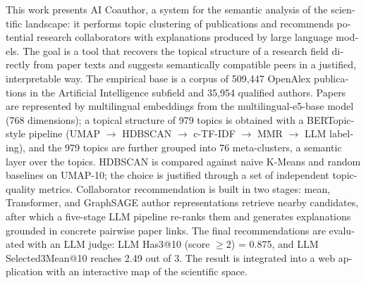\begin{english}
This work presents AI Coauthor, a system for the semantic analysis of the scientific landscape:
it performs topic clustering of publications and recommends potential research collaborators with
explanations produced by large language models. The goal is a tool that recovers the topical
structure of a research field directly from paper texts and suggests semantically compatible peers
in a justified, interpretable way. The empirical base is a corpus of 509{,}447 OpenAlex publications
in the Artificial Intelligence subfield and 35{,}954 qualified authors. Papers are represented by
multilingual embeddings from the multilingual-e5-base model (768 dimensions); a topical structure
of 979 topics is obtained with a BERTopic-style pipeline (UMAP $\to$ HDBSCAN $\to$ c-TF-IDF
$\to$ MMR $\to$ LLM labeling), and the 979 topics are further grouped into 76 meta-clusters, a
semantic layer over the topics. HDBSCAN is compared against naive K-Means and random baselines on
UMAP-10; the choice is justified through a set of independent topic-quality metrics. Collaborator
recommendation is built in two stages: mean, Transformer, and GraphSAGE author representations retrieve nearby
candidates, after which a five-stage LLM pipeline re-ranks them and generates explanations grounded
in concrete pairwise paper links. The final recommendations are evaluated with an LLM judge:
LLM Has3@10 (score $\geq 2$) = 0.875, and LLM Selected3Mean@10 reaches 2.49 out of 3. The
result is integrated into a web application with an
interactive map of the scientific space.
\end{english}
